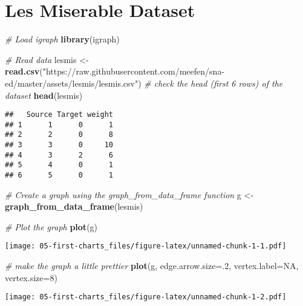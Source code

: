 \documentclass[]{book}
\newenvironment{Shaded}{\begin{snugshade}}{\end{snugshade}}
\newcommand{\CommentTok}[1]{\textcolor[rgb]{0.56,0.35,0.01}{\textit{#1}}}
\newcommand{\DataTypeTok}[1]{\textcolor[rgb]{0.13,0.29,0.53}{#1}}
\newcommand{\DecValTok}[1]{\textcolor[rgb]{0.00,0.00,0.81}{#1}}
\newcommand{\KeywordTok}[1]{\textcolor[rgb]{0.13,0.29,0.53}{\textbf{#1}}}
\newcommand{\NormalTok}[1]{#1}
\newcommand{\OtherTok}[1]{\textcolor[rgb]{0.56,0.35,0.01}{#1}}
\newcommand{\StringTok}[1]{\textcolor[rgb]{0.31,0.60,0.02}{#1}}
\begin{document}
\hypertarget{les-miserable-dataset}{%
\section{Les Miserable Dataset}\label{les-miserable-dataset}}

\begin{Shaded}
\begin{Highlighting}[]
\CommentTok{# Load igraph}
\KeywordTok{library}\NormalTok{(igraph)}

\CommentTok{# Read data}
\NormalTok{lesmis <-}\StringTok{ }\KeywordTok{read.csv}\NormalTok{(}\StringTok{"https://raw.githubusercontent.com/meefen/sna-ed/master/assets/lesmis/lesmis.csv"}\NormalTok{)}
\CommentTok{# check the head (first 6 rows) of the dataset}
\KeywordTok{head}\NormalTok{(lesmis)}
\end{Highlighting}
\end{Shaded}

\begin{verbatim}
##   Source Target weight
## 1      1      0      1
## 2      2      0      8
## 3      3      0     10
## 4      3      2      6
## 5      4      0      1
## 6      5      0      1
\end{verbatim}

\begin{Shaded}
\begin{Highlighting}[]
\CommentTok{# Create a graph using the graph_from_data_frame function}
\NormalTok{g <-}\StringTok{ }\KeywordTok{graph_from_data_frame}\NormalTok{(lesmis)}

\CommentTok{# Plot the graph}
\KeywordTok{plot}\NormalTok{(g)}
\end{Highlighting}
\end{Shaded}

\texttt{[image: 05-first-charts\_files/figure-latex/unnamed-chunk-1-1.pdf]}

\begin{Shaded}
\begin{Highlighting}[]
\CommentTok{# make the graph a little prettier}
\KeywordTok{plot}\NormalTok{(g, }\DataTypeTok{edge.arrow.size=}\NormalTok{.}\DecValTok{2}\NormalTok{, }\DataTypeTok{vertex.label=}\OtherTok{NA}\NormalTok{, }\DataTypeTok{vertex.size=}\DecValTok{8}\NormalTok{)}
\end{Highlighting}
\end{Shaded}

\texttt{[image: 05-first-charts\_files/figure-latex/unnamed-chunk-1-2.pdf]}
\end{document}
